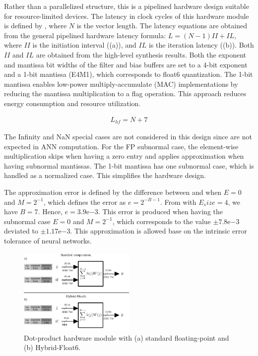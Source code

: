Rather than a parallelized structure, this is a pipelined hardware design suitable for resource-limited devices. The latency in clock cycles of this hardware module is defined by , where $N$ is the vector length. The latency equations are obtained from the general pipelined hardware latency formula: $L=\left(N-1\right)II+IL$, where $II$ is the initiation interval ((a)), and $IL$ is the iteration latency ((b)). Both $II$ and $IL$ are obtained from the high-level synthesis results. Both the exponent and mantissa bit widths of the filter and bias buffers are set to a 4-bit exponent and a 1-bit mantissa (E4M1), which corresponds to float6 quantization. The 1-bit mantissa enables low-power multiply-accumulate (MAC) implementations by reducing the mantissa multiplication to a flag operation. This approach reduces energy consumption and resource utilization.

\begin{eqnarray} \label{eq:dot_custom_float_latency}
L_{hf}=N+7
\end{eqnarray}

The Infinity and NaN special cases are not considered in this design since are not expected in ANN computation. For the FP subnormal case, the element-wise multiplication skips when having a zero entry and applies approximation when having subnormal mantissas. The 1-bit mantissa has one subnormal case, which is handled as a normalized case. This simplifies the hardware design.

The approximation error is defined by the difference between  and  when $E=0$ and $M=2^{-1}$, which defines the error as $e=2^{-B-1}$. From  with $E_size=4$, we have $B=7$. Hence, $e=3.9\mathrm{e}{-3}$. This error is produced when having the subnormal case $E=0$ and $M=2^{-1}$, which corresponds to the value $\pm7.8\mathrm{e}{-3}$ deviated to $\pm1.17\mathrm{e}{-3}$. This approximation is allowed base on the intrinsic error tolerance of neural networks\cite{du2014leveraging}.

\begin{figure}[t!]
	\centering
	\includegraphics[width=0.5\textwidth]{../figures/dot-product_unit.pdf}
	\caption{Dot-product hardware module with (a) standard floating-point and (b) Hybrid-Float6.}
	\label{fig:dot_product}
\end{figure}

